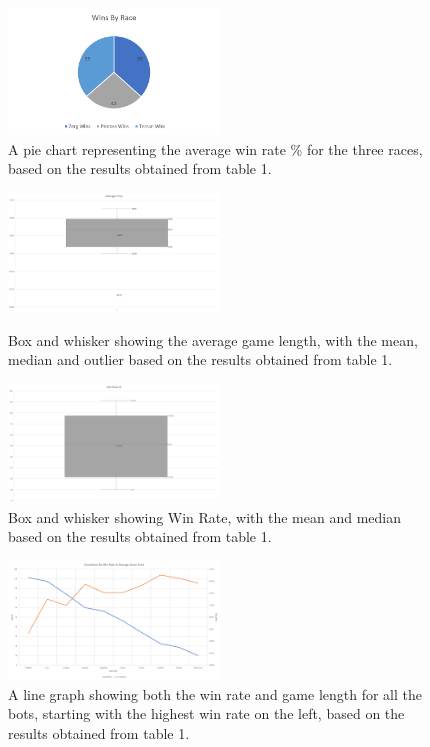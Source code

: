 \documentclass[journal]{IEEEtran}
\begin{document}
\begin{figure}[H]
	\centering
	\includegraphics[width=0.5\textwidth]{RacePie}
	\caption{A pie chart representing the average win rate \% for the three races, based on the results obtained from table 1.}
	\label{Fig4}
\end{figure}
\begin{figure}[H]
	\centering
	\includegraphics[width=0.5\textwidth]{AvgTimeBarBot}
	\caption{Box and whisker showing the average game length, with the mean, median and outlier based on the results obtained from table 1.}
	\label{Fig5}
	\centering
	\includegraphics[width=0.5\textwidth]{WinBarBot}
	\caption{Box and whisker showing Win Rate, with the mean and median based on the results obtained from table 1.}
	\label{Fig6}
\end{figure}
\begin{figure}[H]
	\centering
	\includegraphics[width=0.5\textwidth]{WinTimeLineWithBot}
	\caption{A line graph showing both the win rate and game length for all the bots, starting with the highest win rate on the left, based on the results obtained from table 1.}
	\label{Fig7}
\end{figure}
\end{document}
